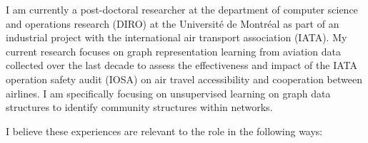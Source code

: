 \documentclass[12pt]{article} %
\begin{document}
\medskip %

I am currently a post-doctoral researcher at the department of computer science and operations research (DIRO) at the Universit\'{e} de Montr\'{e}al as part of an industrial project with the international air transport association (IATA). My current research focuses on graph representation learning from aviation data collected over the last decade to assess the effectiveness and impact of the IATA operation safety audit (IOSA) on air travel accessibility and cooperation between airlines. I am specifically focusing on unsupervised learning on graph data structures to identify community structures within networks.

\medskip %

I believe these experiences are relevant to the role in the following ways: 
\end{document}
